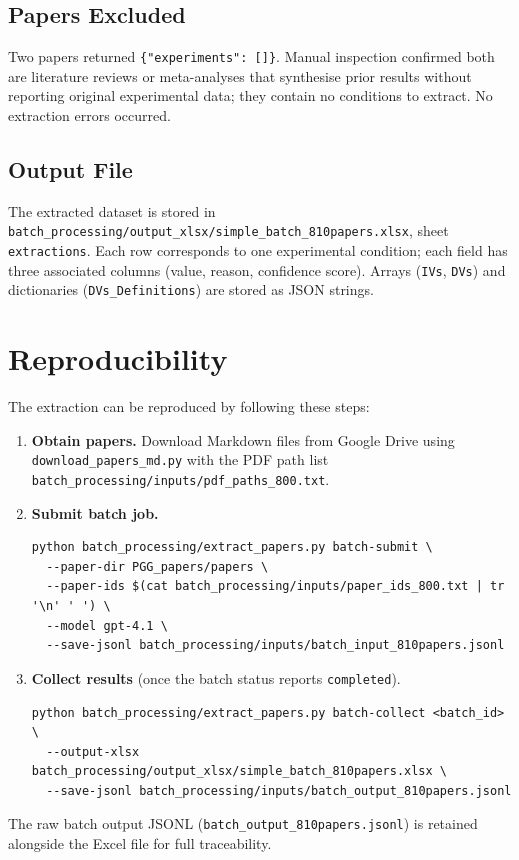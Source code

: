 \documentclass[11pt,a4paper]{article}
\begin{document}
\subsection{Papers Excluded}

Two papers returned \texttt{\{"experiments": []\}}. Manual inspection confirmed both are literature reviews or meta-analyses that synthesise prior results without reporting original experimental data; they contain no conditions to extract. No extraction errors occurred.

\subsection{Output File}

The extracted dataset is stored in \texttt{batch\_processing/output\_xlsx/simple\_batch\_810papers.xlsx}, sheet \texttt{extractions}. Each row corresponds to one experimental condition; each field has three associated columns (value, reason, confidence score). Arrays (\texttt{IVs}, \texttt{DVs}) and dictionaries (\texttt{DVs\_Definitions}) are stored as JSON strings.

\section{Reproducibility}
\label{sec:reproducibility}

The extraction can be reproduced by following these steps:

\begin{enumerate}
  \item \textbf{Obtain papers.} Download Markdown files from Google Drive using \texttt{download\_papers\_md.py} with the PDF path list \texttt{batch\_processing/inputs/pdf\_paths\_800.txt}.

  \item \textbf{Submit batch job.}
\begin{lstlisting}[style=clibox]
python batch_processing/extract_papers.py batch-submit \
  --paper-dir PGG_papers/papers \
  --paper-ids $(cat batch_processing/inputs/paper_ids_800.txt | tr '\n' ' ') \
  --model gpt-4.1 \
  --save-jsonl batch_processing/inputs/batch_input_810papers.jsonl
\end{lstlisting}

  \item \textbf{Collect results} (once the batch status reports \texttt{completed}).
\begin{lstlisting}[style=clibox]
python batch_processing/extract_papers.py batch-collect <batch_id> \
  --output-xlsx batch_processing/output_xlsx/simple_batch_810papers.xlsx \
  --save-jsonl batch_processing/inputs/batch_output_810papers.jsonl
\end{lstlisting}
\end{enumerate}

\noindent The raw batch output JSONL (\texttt{batch\_output\_810papers.jsonl}) is retained alongside the Excel file for full traceability.
\end{document}
